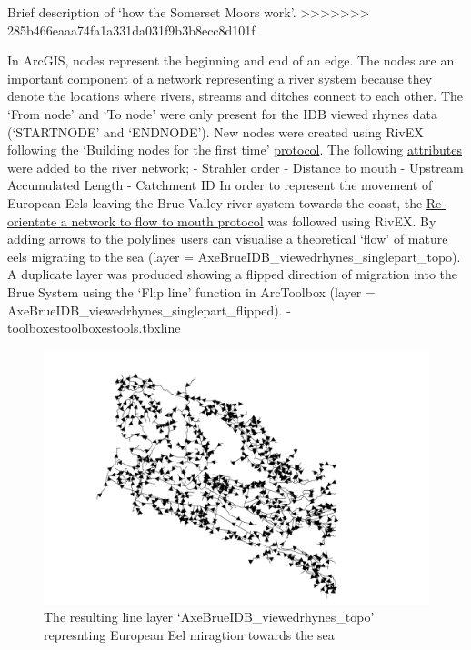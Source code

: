 \documentclass[]{article}
\begin{document}
Brief description of `how the Somerset Moors work'.
\textgreater{}\textgreater{}\textgreater{}\textgreater{}\textgreater{}\textgreater{}\textgreater{}
285b466eaaa74fa1a331da031f9b3b8ecc8d101f

In ArcGIS, nodes represent the beginning and end of an edge. The nodes
are an important component of a network representing a river system
because they denote the locations where rivers, streams and ditches
connect to each other. The `From node' and `To node' were only present
for the IDB viewed rhynes data (`STARTNODE' and `ENDNODE'). New nodes
were created using RivEX following the `Building nodes for the first
time'
\href{http://www.rivex.co.uk/Online-Manual/Buildingnodesforthefirsttime.html}{protocol}.
The following
\href{http://www.rivex.co.uk/Online-Manual/Attributerivernetwork.html}{attributes}
were added to the river network; - Strahler order - Distance to mouth -
Upstream Accumulated Length - Catchment ID In order to represent the
movement of European Eels leaving the Brue Valley river system towards
the coast, the
\href{http://www.rivex.co.uk/Online-Manual/Reorientateanetworktoflowtomouth.html}{Re-orientate
a network to flow to mouth protocol} was followed using RivEX. By adding
arrows to the polylines users can visualise a theoretical `flow' of
mature eels migrating to the sea (layer =
AxeBrueIDB\_viewedrhynes\_singlepart\_topo). A duplicate layer was
produced showing a flipped direction of migration into the Brue System
using the `Flip line' function in ArcToolbox (layer =
AxeBrueIDB\_viewedrhynes\_singlepart\_flipped). -
toolboxes\system toolboxes\editing tools.tbx\flip line

\begin{figure}
\centering
\includegraphics{AxeBrueIDB_viewedrhynes_topo.jpg}
\caption{The resulting line layer `AxeBrueIDB\_viewedrhynes\_topo'
represnting European Eel miragtion towards the sea}
\end{figure}
\end{document}
